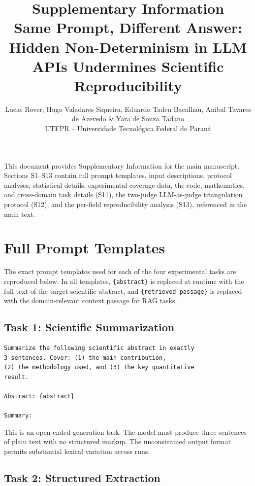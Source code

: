 \documentclass[11pt]{article}
\title{\textbf{Supplementary Information}\\[6pt]
Same Prompt, Different Answer:\\Hidden Non-Determinism in LLM APIs Undermines Scientific Reproducibility}
\author{Lucas Rover, Hugo Valadares Siqueira, Eduardo Tadeu Bacalhau, Anibal Tavares de Azevedo \& Yara de Souza Tadano\\
\small UTFPR -- Universidade Tecnol\'ogica Federal do Paran\'a}
\date{}
\begin{document}
\maketitle

\noindent This document provides Supplementary Information for the main manuscript. Sections S1--S13 contain full prompt templates, input descriptions, protocol analyses, statistical details, experimental coverage data, the code, mathematics, and cross-domain task details (S11), the two-judge LLM-as-judge triangulation protocol (S12), and the per-field reproducibility analysis (S13), referenced in the main text.

\tableofcontents
\newpage


\section{Full Prompt Templates}
\label{sec:s1}

The exact prompt templates used for each of the four experimental tasks are reproduced below. In all templates, \texttt{\{abstract\}} is replaced at runtime with the full text of the target scientific abstract, and \texttt{\{retrieved\_passage\}} is replaced with the domain-relevant context passage for RAG tasks.

\subsection{Task 1: Scientific Summarization}

\begin{lstlisting}[caption={Prompt template for Task 1 (scientific summarization).}]
Summarize the following scientific abstract in exactly
3 sentences. Cover: (1) the main contribution,
(2) the methodology used, and (3) the key quantitative
result.

Abstract: {abstract}

Summary:
\end{lstlisting}

\noindent This is an open-ended generation task. The model must produce three sentences of plain text with no structured markup. The unconstrained output format permits substantial lexical variation across runs.

\subsection{Task 2: Structured Extraction}
\end{document}
